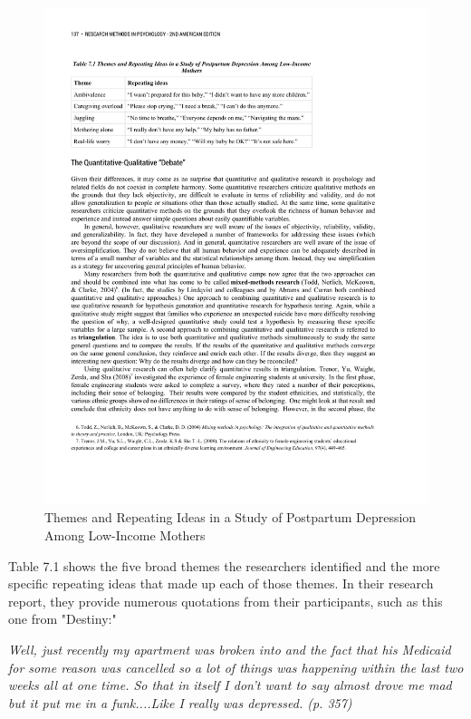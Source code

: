 \begin{figure}

\includegraphics[width=\linewidth]{figures/C7qualtable.pdf}

\caption{Themes and Repeating Ideas in a Study of Postpartum Depression Among Low-Income Mothers}

\label{fig:qualtable}

\end{figure}

Table 7.1 shows the five broad themes the researchers identified and the more specific repeating ideas that made up each of those themes. In their research report, they provide numerous quotations from their participants, such as this one from "Destiny:"

\emph{Well, just recently my apartment was broken into and the fact that his Medicaid for some reason was cancelled so a lot of things was happening within the last two weeks all at one time. So that in itself I don't want to say almost drove me mad but it put me in a funk....Like I really was depressed. (p. 357)}

